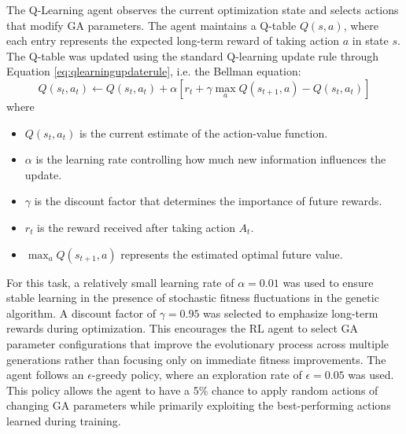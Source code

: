 \documentclass{article}
\begin{document}
The Q-Learning agent observes the current optimization state and selects actions that modify GA parameters. The agent maintains a Q-table $Q(s,a)$, where each entry represents the expected long-term reward of taking action $a$ in state $s$. The Q-table was updated using the standard Q-learning update rule through Equation \ref{eq:qlearningupdaterule}, i.e. the Bellman equation:
\begin{equation}
    Q(s_t, a_t) \leftarrow Q(s_t, a_t) + \alpha \left[ r_t + \gamma \max_a Q(s_{t+1}, a) - Q(s_t, a_t) \right]
    \label{eq:qlearningupdaterule}
\end{equation}
where 
\begin{itemize}
    \item $Q(s_t, a_t)$ is the current estimate of the action-value function.
    
    \item $\alpha$ is the learning rate controlling how much new information influences the update.
    
    \item $\gamma$ is the discount factor that determines the importance of future rewards.
    
    \item $r_t$ is the reward received after taking action $A_t$.
    
    \item $\max_a Q(s_{t+1}, a)$ represents the estimated optimal future value.
\end{itemize}

For this task, a relatively small learning rate of $\alpha = 0.01$ was used to ensure stable learning in the presence of stochastic fitness fluctuations in the genetic algorithm. A discount factor of $\gamma = 0.95$ was selected to emphasize long-term rewards during optimization. This encourages the RL agent to select GA parameter configurations that improve the evolutionary process across multiple generations rather than focusing only on immediate fitness improvements. The agent follows an $\epsilon$-greedy policy, where an exploration rate of $\epsilon = 0.05$ was used. This policy allows the agent to have a 5\% chance to apply random actions of changing GA parameters while primarily exploiting
the best-performing actions learned during training.
\end{document}
